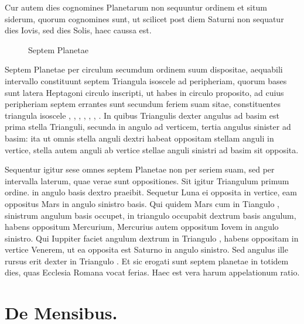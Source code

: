 Cur autem dies cognomines Planetarum non sequuntur ordinem et
situm siderum, quorum cognomines sunt, ut scilicet post diem Saturni
non sequatur dies Iovis, sed dies Solis, haec caussa est.
\begin{figure}[hbtp]
  \centering
  \def\svgwidth{9\baselineskip}
  {\astrofont}
  \caption{Septem Planetae}
  \label{fig:p008}
\end{figure}
Septem Planetae
per circulum secumdum ordinem suum
dispositae, aequabili intervallo constituunt septem
Triangula isoscele ad peripheriam, quorum
bases sunt latera Heptagoni circulo inscripti,
ut habes in circulo proposito, ad cuius
peripheriam septem errantes sunt secundum
feriem suam sitae, constituentes triangula
isoscele , , ,
 , , , .
In quibus Triangulis dexter angulus ad basim
est prima stella Trianguli, secunda in angulo ad verticem, tertia angulus
sinister ad basim: ita ut omnis stella anguli dextri habeat oppositam
stellam anguli in vertice, stella autem anguli ab vertice stellae
anguli sinistri ad basim sit opposita.

Sequentur igitur sese omnes septem
Planetae non per seriem suam, sed per intervalla laterum, quae
verae sunt oppositiones.
Sit igitur Triangulum  primum ordine.
 in angulo basis dextro praeibit.
Sequetur Luna ei opposita in vertice,
eam oppositus Mars in angulo sinistro basis.
Qui quidem Mars cum in
Tiangulo , sinistrum angulum basis occupet,
 in triangulo  occupabit
dextrum basis angulum, habens oppositum Mercurium,
Mercurius autem oppositum Iovem in angulo sinistro.
Qui Iuppiter
faciet angulum dextrum in Triangulo , habens oppositam in vertice
Venerem, ut ea opposita est Saturno in angulo sinistro.
Sed angulus
ille rursus erit dexter in Triangulo .
Et sic erogati sunt septem
planetae in totidem dies, quas Ecclesia Romana vocat ferias.
Haec est vera harum appelationum ratio.

\section{De Mensibus.}

